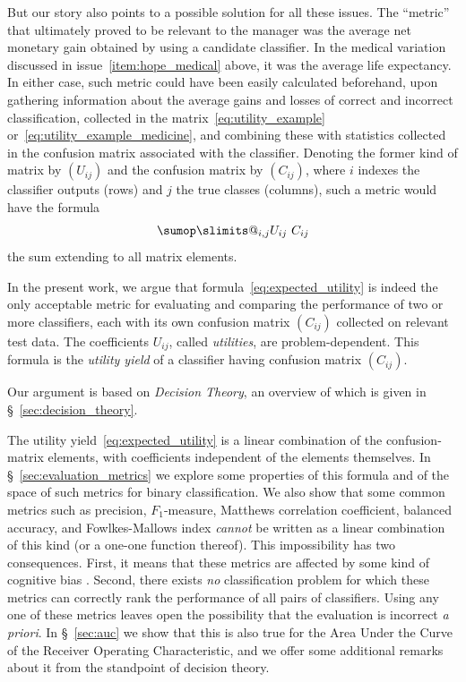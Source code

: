 \documentclass[\ifafour a4paper,12pt,\else a5paper,10pt,\fi%
onecolumn,oneside,article,%
british%
]{memoir}
\makeatletter
\theoremstyle{remark}
\theoremstyle{innote}
\def\sum{\DOTSI\sumop\slimits@}
\renewcommand*{\|}[1][]{\nonscript\:#1\vert\nonscript\:\mathopen{}}
\newcommand*{\sect}{\S}%
\makeatother
\begin{document}
\bigskip

But our story also points to a possible solution for all these issues. The \enquote{metric} that ultimately proved to be relevant to the manager was the average net monetary gain obtained by using a candidate classifier. In the medical variation discussed in issue~\ref{item:hope_medical} above, it was the average life expectancy. In either case, such metric could have been easily calculated beforehand, upon gathering information about the average gains and losses of correct and incorrect classification, collected in the matrix~\eqref{eq:utility_example} or~\eqref{eq:utility_example_medicine}, and combining these with statistics collected in the confusion matrix associated with the classifier. Denoting the former kind of matrix by $(U_{ij})$ and the confusion matrix by $(C_{ij})$, where $i$ indexes the classifier outputs (rows) and $j$ the true classes (columns), such a metric would have the formula
\begin{equation}
  \label{eq:expected_utility}
  \sum_{i,j} U_{ij}\ C_{ij} 
\end{equation}
the sum extending to all matrix elements.

\medskip

In the present work, we argue that formula~\eqref{eq:expected_utility} is indeed the only acceptable metric for evaluating and comparing the performance of two or more classifiers, each with its own confusion matrix $(C_{ij})$ collected on relevant test data. The coefficients $U_{ij}$, called \emph{utilities}, are problem-dependent. This formula is the \emph{utility yield} of a classifier having confusion matrix $(C_{ij})$.

Our argument is based on \emph{Decision Theory}, an overview of which is given in \sect~\ref{sec:decision_theory}.

The utility yield~\eqref{eq:expected_utility} is a linear combination of the confusion-matrix elements, with coefficients independent of the elements themselves. In \sect~\ref{sec:evaluation_metrics} we explore some properties of this formula and of the space of such metrics for binary classification. We also show that some common metrics such as precision, $F_{1}$-measure, Matthews correlation coefficient, balanced accuracy, and Fowlkes-Mallows index \emph{cannot} be written as a linear combination of this kind (or a one-one function thereof). This impossibility has two consequences. First, it means that these metrics are affected by some kind of cognitive bias \autocites{hastieetal2001_r2010,eells1982_r2016}. Second, there exists \emph{no} classification problem for which these metrics can correctly rank the performance of all pairs of classifiers. Using any one of these metrics leaves open the possibility that the evaluation is incorrect \emph{a priori}. In \sect~\ref{sec:auc} we show that this is also true for the Area Under the Curve of the Receiver Operating Characteristic, and we offer some additional remarks about it from the standpoint of decision theory.
\end{document}
